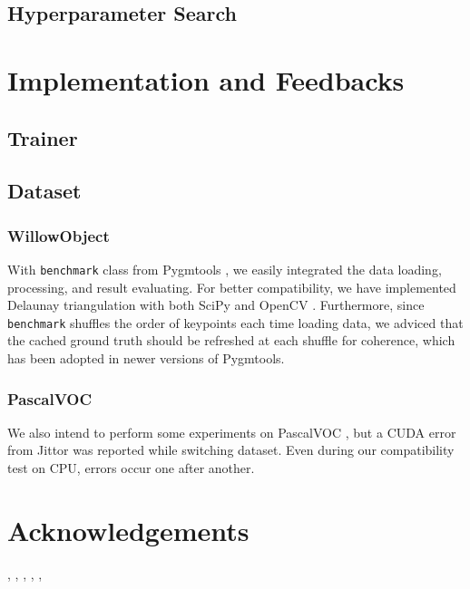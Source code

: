 \documentclass[a4paper]{article}
\begin{document}
\subsection{Hyperparameter Search}



\section{Implementation and Feedbacks}

\subsection{Trainer}

\subsection{Dataset}
\subsubsection{WillowObject}
With \texttt{benchmark} class from Pygmtools \cite{pygmtools}, we easily integrated the data loading, processing, and result evaluating. For better compatibility, we have implemented Delaunay triangulation with both SciPy \cite{scipy} and OpenCV \cite{opencv}. Furthermore, since \texttt{benchmark} shuffles the order of keypoints each time loading data, we adviced that the cached ground truth should be refreshed at each shuffle for coherence, which has been adopted in newer versions of Pygmtools. 

\subsubsection{PascalVOC}
We also intend to perform some experiments on PascalVOC \cite{voc1,voc2}, but a CUDA error from Jittor \cite{jittor} was reported while switching dataset. Even during our compatibility test on CPU, errors occur one after another.

\section{Acknowledgements}

\cite{pca-ipca}, \cite{cie}, \cite{voc1}, \cite{voc2}, \cite{willow}, \cite{vgg}

\newpage 


\end{document}
